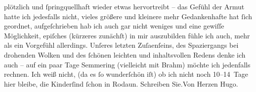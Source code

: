\begin{ledgroupsized}[t]{13cm}
               plötzlich und ſpringquellhaft wieder etwas {\pb}hervortreibt – das Gefühl der
               Armut hatte ich jedesfalls nicht, vieles größere und kleinere mehr Gedankenhafte hat
               ſich geordnet, aufgeſchrieben hab ich auch gar nicht weniges und eine gewiſſe
               Möglichkeit, epiſches (kürzeres zunächſt) in mir auszubilden fühle ich auch, mehr als
               ein Vorgefühl {\pb}allerdings. Unſeres
               letzten Zuſa{\geminationm}enſeins, des Spaziergangs bei drohenden
               Wolken und des ſchönen leichten und inhaltsvollen Redens denke ich auch – auf ein
               paar Tage Semmering (vielleicht mit Brahm) möchte ich jedenfalls rechnen.\pend
           \pstart
           Ich weiß nicht, (da es ſo wunderſchön iſt) ob ich nicht noch 10–14 Tage hier bleibe,
               die Kinderſind ſchon in Rodaun.\pend
           \pstart
            Schreiben Sie.\hspace*{1.5em}Von Herzen\pend
           \pstart \spacefill\mbox{Hugo.}\pend{}
         
         \endnumbering{}\end{ledgroupsized}  \newcommand{\dateiname}{L01624}\newcommand{\titel}{Hugo von Hofmannsthal an Arthur Schnitzler, 4. [9. 1906]}\newcommand{\editorInnen}{Martin Anton Müller und Gerd-Hermann Susen}
      